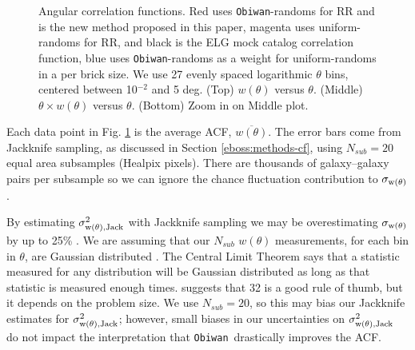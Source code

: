 \documentclass[a4paper,fleqn,usenatbib]{mnras}
\newcommand{\obiwan}{{\tt Obiwan}}
\begin{document}
\begin{figure}
     \hfill
     \hfill
\caption{Angular correlation functions. Red uses \obiwan-randoms for RR and is the new method proposed in this paper, magenta uses uniform-randoms for RR, and black is the ELG mock catalog correlation function, blue uses \obiwan-randoms as a weight for uniform-randoms in a per brick size. We use 27 evenly spaced logarithmic $\theta$ bins, centered between 10$^{-2}$ and 5 deg. (Top) $w(\theta)$ versus $\theta$. (Middle) $\theta \times w(\theta)$ versus $\theta$. (Bottom) Zoom in on Middle plot.}
\label{fig:cf}
\end{figure}

Each data point in Fig. \ref{fig:cf} is the average ACF, $\overline{w(\theta)}$. The error bars come from Jackknife sampling, as discussed in Section \ref{eboss:methods-cf}, using $N_{sub} = 20$ equal area subsamples (Healpix pixels). There are thousands of galaxy--galaxy pairs per subsample so we can ignore the chance fluctuation contribution to $\sigma_{\rm{w(\theta)}}$. 

By estimating $\sigma_{\rm{w(\theta), Jack}}^2$ with Jackknife sampling we may be overestimating $\sigma_{\rm{w(\theta)}}$ by up to 25\% \cite{corrfuncErrors}. We are assuming that our $N_{sub}$ $w(\theta)$ measurements, for each bin in $\theta$, are Gaussian distributed \cite{corrfuncHamilton}. The Central Limit Theorem says that a statistic measured for any distribution will be Gaussian distributed as long as that statistic is measured enough times. \cite{astroML} suggests that 32 is a good rule of thumb, but it depends on the problem size. We use $N_{sub} = 20$, so this may bias our Jackknife estimates for $\sigma_{\rm{w(\theta), Jack}}^2$; however, small biases in our uncertainties on $\sigma_{\rm{w(\theta), Jack}}^2$ do not impact the interpretation that \obiwan\, drastically improves the ACF.

\end{document}
